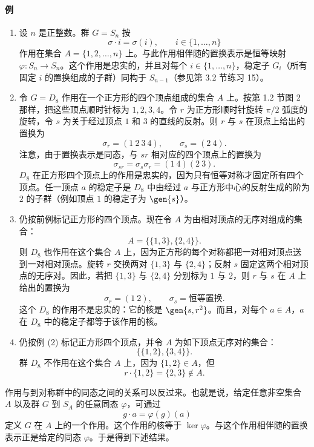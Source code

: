 \paragraph{例}
\begin{enumerate}[label=(\arabic*)]
  \item 设 $n$ 是正整数。群 $G=S_n$ 按
  \[
    \sigma\cdot i=\sigma(i),\qquad i\in\{1,\ldots,n\}
  \]
  作用在集合 $A=\{1,2,\ldots,n\}$ 上。与此作用相伴随的置换表示是恒等映射 $\varphi:S_n\to S_n$。这个作用是忠实的，并且对每个 $i\in\{1,\ldots,n\}$，稳定子 $G_i$（所有固定 $i$ 的置换组成的子群）同构于 $S_{n-1}$（参见第 3.2 节练习 15）。

  \item 令 $G=D_8$ 作用在一个正方形的四个顶点组成的集合 $A$ 上。按第 1.2 节图 2 那样，把这些顶点顺时针标为 $1,2,3,4$。令 $r$ 为正方形顺时针旋转 $\pi/2$ 弧度的旋转，令 $s$ 为关于经过顶点 $1$ 和 $3$ 的直线的反射。则 $r$ 与 $s$ 在顶点上给出的置换为
  \[
    \sigma_r=(1\ 2\ 3\ 4),\qquad \sigma_s=(2\ 4).
  \]
  注意，由于置换表示是同态，与 $sr$ 相对应的四个顶点上的置换为
  \[
    \sigma_{sr}=\sigma_s\sigma_r=(1\ 4)(2\ 3).
  \]
  $D_8$ 在正方形四个顶点上的作用是忠实的，因为只有恒等对称才固定所有四个顶点。任一顶点 $a$ 的稳定子是 $D_8$ 中由经过 $a$ 与正方形中心的反射生成的阶为 $2$ 的子群（例如顶点 $1$ 的稳定子为 $\gen{s}$）。

  \item 仍按前例标记正方形的四个顶点。现在令 $A$ 为由相对顶点的无序对组成的集合：
  \[
    A=\bigl\{\{1,3\},\{2,4\}\bigr\}.
  \]
  则 $D_8$ 也作用在这个集合 $A$ 上，因为正方形的每个对称都把一对相对顶点送到一对相对顶点。旋转 $r$ 交换两对 $\{1,3\}$ 与 $\{2,4\}$；反射 $s$ 固定这两个相对顶点的无序对。因此，若把 $\{1,3\}$ 与 $\{2,4\}$ 分别标为 $1$ 与 $2$，则 $r$ 与 $s$ 在 $A$ 上给出的置换为
  \[
    \sigma_r=(1\ 2),\qquad \sigma_s=\text{恒等置换}.
  \]
  这个 $D_8$ 的作用不是忠实的：它的核是 $\gen{s,r^2}$。而且，对每个 $a\in A$，$a$ 在 $D_8$ 中的稳定子都等于该作用的核。

  \item 仍按例 (2) 标记正方形四个顶点，并令 $A$ 为如下顶点无序对的集合：
  \[
    \bigl\{\{1,2\},\{3,4\}\bigr\}.
  \]
  群 $D_8$ 不作用在这个集合 $A$ 上，因为 $\{1,2\}\in A$，但
  \[
    r\cdot\{1,2\}=\{2,3\}\notin A.
  \]
\end{enumerate}

作用与到对称群中的同态之间的关系可以反过来。也就是说，给定任意非空集合 $A$ 以及群 $G$ 到 $S_A$ 的任意同态 $\varphi$，可通过
\[
  g\cdot a=\varphi(g)(a)
\]
定义 $G$ 在 $A$ 上的一个作用。这个作用的核等于 $\ker\varphi$。与这个作用相伴随的置换表示正是给定的同态 $\varphi$。于是得到下述结果。

